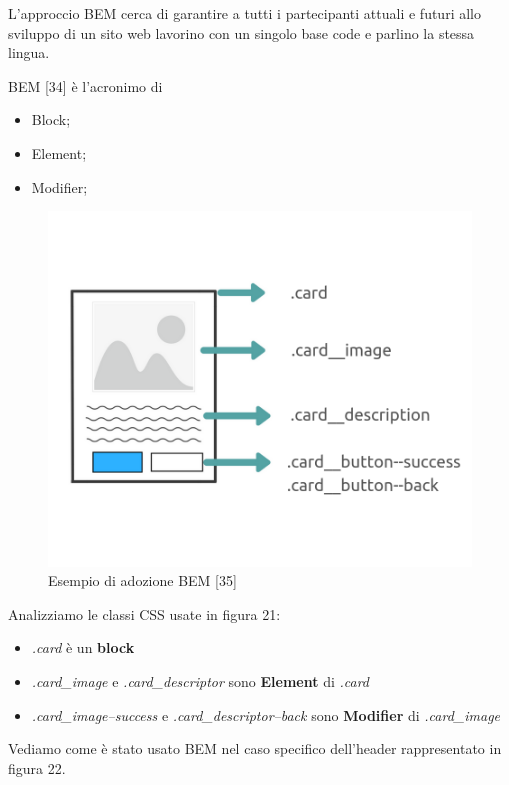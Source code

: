 L'approccio BEM cerca di garantire a tutti i partecipanti attuali e futuri allo sviluppo di un sito web
lavorino con un singolo base code e parlino la stessa lingua. 

BEM [34] è l'acronimo di 
\begin{itemize}
\item Block;
\item Element;
\item Modifier;
\end{itemize}

\begin{figure}[H]
    \centering  
    \caption{Esempio di adozione BEM [35]}
    \includegraphics[scale=0.5]{img/cap3/bem-1}
\end{figure}

Analizziamo le classi CSS usate in figura 21:

\begin{itemize}
    \item \textit{.card} è un \textbf{block}
    \item \textit{.card{\_}image} e  \textit{.card{\_}descriptor} sono \textbf{Element} di \textit{.card}
    \item \textit{.card{\_}image--success} e  \textit{.card{\_}descriptor--back} sono 
    \textbf{Modifier} di \textit{.card{\_}image}
\end{itemize}

Vediamo come è stato usato BEM nel caso specifico dell'header rappresentato in figura 22.

